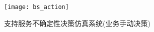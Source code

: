 \begin{figure}[htbp]
    \centering
    \texttt{[image: bs\_action]}
    \caption{支持服务不确定性决策仿真系统(业务手动决策)}\label{figure:bs_action}
    \vspace{-1em}
\end{figure}






%
%
%
%
%
%
%
%
%
